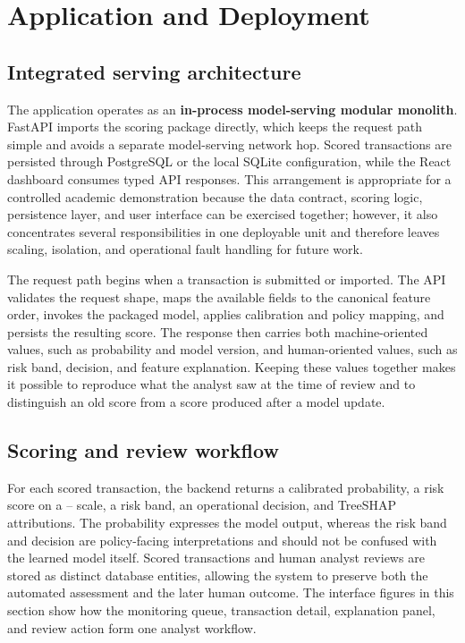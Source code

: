 \chapter{Application and Deployment}
\label{chap:application}

\section{Integrated serving architecture}

The application operates as an \textbf{in-process model-serving modular monolith}. FastAPI imports the scoring package directly, which keeps the request path simple and avoids a separate model-serving network hop. Scored transactions are persisted through PostgreSQL or the local SQLite configuration, while the React dashboard consumes typed API responses. This arrangement is appropriate for a controlled academic demonstration because the data contract, scoring logic, persistence layer, and user interface can be exercised together; however, it also concentrates several responsibilities in one deployable unit and therefore leaves scaling, isolation, and operational fault handling for future work.

The request path begins when a transaction is submitted or imported. The API
validates the request shape, maps the available fields to the canonical
feature order, invokes the packaged model, applies calibration and policy
mapping, and persists the resulting score. The response then carries both
machine-oriented values, such as probability and model version, and
human-oriented values, such as risk band, decision, and feature explanation.
Keeping these values together makes it possible to reproduce what the analyst
saw at the time of review and to distinguish an old score from a score produced
after a model update.

\section{Scoring and review workflow}

For each scored transaction, the backend returns a calibrated probability, a risk score on a -- scale, a risk band, an operational decision, and TreeSHAP attributions. The probability expresses the model output, whereas the risk band and decision are policy-facing interpretations and should not be confused with the learned model itself. Scored transactions and human analyst reviews are stored as distinct database entities, allowing the system to preserve both the automated assessment and the later human outcome. The interface figures in this section show how the monitoring queue, transaction detail, explanation panel, and review action form one analyst workflow.

